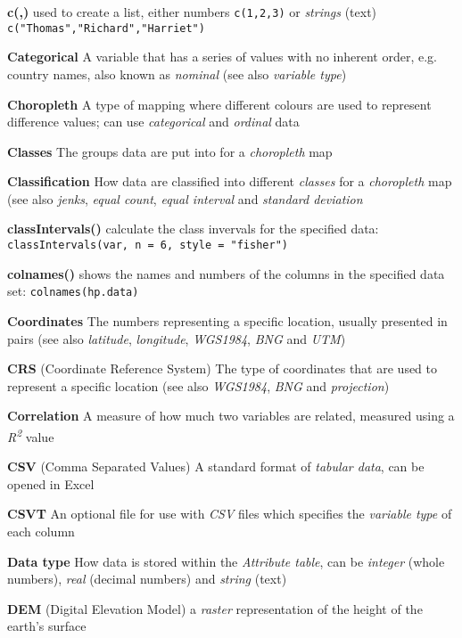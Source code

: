 \documentclass[a4paper,10pt]{article}
\begin{document}
\begin{multicols}{2}
\textbf{c(,)} used to create a list, either numbers \texttt{c(1,2,3)} or \textit{strings} (text) \texttt{c("Thomas","Richard","Harriet")}

\textbf{Categorical} A variable that has a series of values with no inherent order, e.g. country names, also known as \textit{nominal} (see also \textit{variable type}) 

\textbf{Choropleth} A type of mapping where different colours are used to represent difference values; can use \textit{categorical} and \textit{ordinal} data

\textbf{Classes} The groups data are put into for a \textit{choropleth} map

\textbf{Classification} How data are classified into different \textit{classes} for a \textit{choropleth} map (see also \textit{jenks}, \textit{equal count}, \textit{equal interval} and \textit{standard deviation}

\textbf{classIntervals()} calculate the class invervals for the specified data: \texttt{classIntervals(var, n = 6, style = "fisher")}

\textbf{colnames()} shows the names and numbers of the columns in the specified data set: \texttt{colnames(hp.data)}

\textbf{Coordinates} The numbers representing a specific location, usually presented in pairs (see also \textit{latitude}, \textit{longitude}, \textit{WGS1984}, \textit{BNG} and \textit{UTM})

\textbf{CRS} (Coordinate Reference System) The type of coordinates that are used to represent a specific location (see also \textit{WGS1984}, \textit{BNG} and \textit{projection})

\textbf{Correlation} A measure of how much two variables are related, measured using a \textit{R\textsuperscript{2}} value 

\textbf{CSV} (Comma Separated Values) A standard format of \textit{tabular data}, can be opened in Excel  

\textbf{CSVT} An optional file for use with \textit{CSV} files which specifies the \textit{variable type} of each column %

\textbf{Data type} How data is stored within the \textit{Attribute table}, can be \textit{integer} (whole numbers), \textit{real} (decimal numbers) and \textit{string} (text) 

\textbf{DEM} (Digital Elevation Model) a \textit{raster} representation of the height of the earth's surface


\end{multicols}
\end{document}
